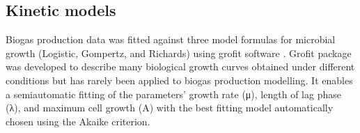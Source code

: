 \subsection{Kinetic models}
Biogas production data was fitted against three model formulas for microbial growth (Logistic, Gompertz, and Richards) using grofit software \cite{Kahm_2010}. Grofit  package was developed to describe many biological growth curves obtained under different conditions but has rarely been applied to biogas production modelling. It enables a semiautomatic fitting of the parameters’ growth rate (μ), length of lag phase (λ), and maximum cell growth (A) with the best fitting model automatically chosen using the Akaike criterion.